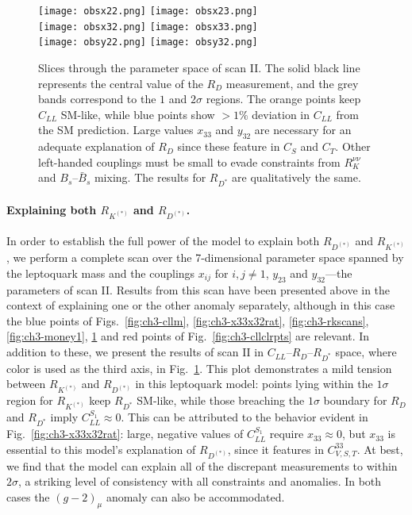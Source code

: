 \begin{figure}
    \texttt{[image: obsx22.png]} \hfill
    \texttt{[image: obsx23.png]} \\
    \texttt{[image: obsx32.png]} \hfill
    \texttt{[image: obsx33.png]} \\
    \texttt{[image: obsy22.png]} \hfill
    \texttt{[image: obsy32.png]}
    \caption[Slices through the parameter space of scan II.]{Slices through the
      parameter space of scan II. The solid black line represents the central
      value of the $R_D$ measurement, and the grey bands correspond to the $1$
      and $2\sigma$ regions. The orange points keep $C_{LL}$ SM-like, while blue
      points show $> 1\%$ deviation in $C_{LL}$ from the SM prediction. Large
      values $x_{33}$ and $y_{32}$ are necessary for an adequate explanation of
      $R_D$ since these feature in $C_S$ and $C_T$. Other left-handed couplings
      must be small to evade constraints from $R_K^{\nu\nu}$ and
      $B_s$--$\bar{B}_s$ mixing. The results for $R_{D^*}$ are qualitatively the
      same.}
  \label{fig:ch3-ObsScans}
\end{figure}

\paragraph{Explaining both $R_{K^{(*)}}$ and $R_{D^{(*)}}$.} In order to
establish the full power of the model to explain both $R_{D^{(*)}}$ and
$R_{K^{(*)}}$, we perform a complete scan over the 7-dimensional parameter space
spanned by the leptoquark mass and the couplings $x_{ij}$ for $i,j \neq 1$,
$y_{23}$ and $y_{32}$---the parameters of scan II. Results from this scan have
been presented above in the context of explaining one or the other anomaly
separately, although in this case the blue points of Figs.~\ref{fig:ch3-cllm},
\ref{fig:ch3-x33x32rat}, \ref{fig:ch3-rkscans}, \ref{fig:ch3-money1}, \ref{fig:ch3-ObsScans} and
red points of Fig.~\ref{fig:ch3-cllclrpts} are relevant. In addition to these, we
present the results of scan II in $C_{LL}$--$R_D$--$R_{D^*}$ space, where color
is used as the third axis, in Fig.~\ref{fig:ch3-ObsScans}. This plot demonstrates a
mild tension between $R_{K^{(*)}}$ and $R_{D^{(*)}}$ in this leptoquark model:
points lying within the $1\sigma$ region for $R_{K^{(*)}}$ keep $R_{ D^* }$
SM-like, while those breaching the $1\sigma$ boundary for $R_D$ and $R_{D^*}$
imply $C^{S_{1}}_{LL} \approx 0$. This can be attributed to the behavior evident in
Fig.~\ref{fig:ch3-x33x32rat}: large, negative values of $C_{LL}^{S_{1}}$ require
$x_{33} \approx 0$, but $x_{33}$ is essential to this model's explanation of
$R_{D^{(*)}}$, since it features in $C^{33}_{V,S,T}$. At best, we find that the
model can explain all of the discrepant measurements to within $2\sigma$, a
striking level of consistency with all constraints and anomalies. In both cases
the $(g-2)_\mu$ anomaly can also be accommodated.


